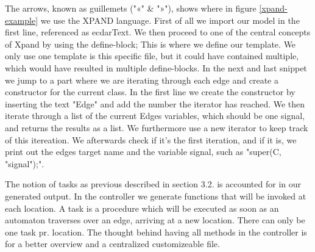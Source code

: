 The arrows, known as guillemets ("«" & "»"), shows where in figure \ref{xpand-example} we use the XPAND language. First of all we import our model in the first line, referenced as ecdarText. We then proceed to one of the central concepts of Xpand by using the define-block; This is where we define our template. We only use one template is this specific file, but it could have contained multiple, which would have resulted in multiple define-blocks. In the next and last snippet we jump to a part where we are iterating through each edge and create a constructor for the current class. In the first line we create the constructor by inserting the text "Edge" and add the number the iterator has reached. We then iterate through a list of the current Edges variables, which should be one signal, and returns the results as a list. We furthermore use a new iterator to keep track of this itereation. We afterwards check if it's the first iteration, and if it is, we print out the edges target name and the variable signal, such as "super(C, "signal");".

The notion of tasks as previous described in section 3.2. is accounted for in our generated output. In the controller we generate functions that will be invoked at each location. A task is a procedure which will be executed as soon as an automaton traverses over an edge, arriving at a new location. There can only be one task pr. location. The thought behind having all methods in the controller is for a better overview and a centralized customizeable file.

